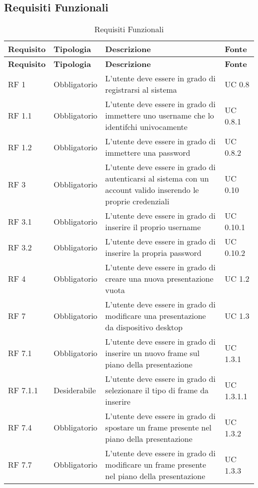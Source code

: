 \subsection{Requisiti Funzionali}{ 
\renewcommand*{\arraystretch}{1.4} 
\begin{longtable} [c]{| p{2.5cm} | p{2.5cm} | p{6cm} |p{2.5cm}|} 
\caption{Requisiti Funzionali \label{tab:reqFunzionali}}\\ \hline\textbf{Requisito} & \textbf{Tipologia} & \textbf{Descrizione} & \textbf{Fonte} \\ 
\hline \endfirsthead \hline 
\textbf{Requisito} & \textbf{Tipologia} & \textbf{Descrizione} & \textbf{Fonte} \\ 
\hline \endhead \hline \endfoot \hline \endlastfoot 
RF 1 & Obbligatorio & L’utente deve essere in grado di registrarsi al sistema & UC 0.8\\ 
 \hline 
RF 1.1 & Obbligatorio & L’utente deve essere in grado di immettere uno username che lo identifchi univocamente & UC 0.8.1\\ 
 \hline 
RF 1.2 & Obbligatorio & L'utente deve essere in grado di immettere una password & UC 0.8.2\\ 
 \hline 
RF 3 & Obbligatorio & L’utente deve essere in grado di autenticarsi al sistema con un account valido inserendo le proprie credenziali & UC 0.10\\ 
 \hline 
RF 3.1 & Obbligatorio & L'utente deve essere in grado di inserire il proprio username & UC 0.10.1\\ 
 \hline 
RF 3.2 & Obbligatorio & L'utente deve essere in grado di inserire la propria password & UC 0.10.2\\ 
 \hline 
RF 4 & Obbligatorio & L’utente deve essere in grado di creare una nuova presentazione vuota & UC 1.2\\ 
 \hline 
RF 7 & Obbligatorio & L'utente deve essere in grado di modificare una presentazione da dispositivo desktop & UC 1.3\\ 
 \hline 
RF 7.1 & Obbligatorio & L'utente deve essere in grado di inserire un nuovo frame sul piano della presentazione & UC 1.3.1\\ 
 \hline 
RF 7.1.1 & Desiderabile & L'utente deve essere in grado di selezionare il tipo di frame da inserire & UC 1.3.1.1\\ 
 \hline 
RF 7.4 & Obbligatorio & L'utente deve essere in grado di spostare un frame presente nel piano della presentazione & UC 1.3.2\\ 
 \hline 
RF 7.7 & Obbligatorio & L'utente deve essere in grado di modificare un frame presente nel piano della presentazione & UC 1.3.3\\ 

\end{longtable}}

